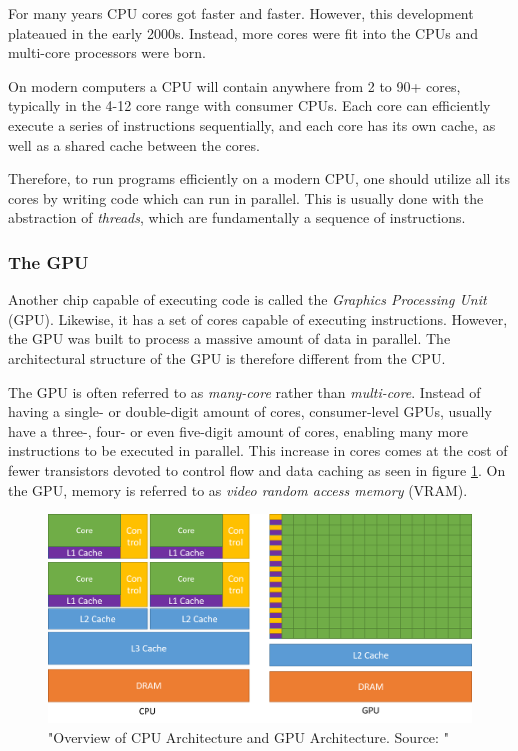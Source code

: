 \noindent For many years CPU cores got faster and faster. However, this development plateaued in the early 2000s. Instead, more cores were fit into the CPUs and multi-core processors were born.\cite{karlrupp:processor_trend_data}

On modern computers a CPU will contain anywhere from 2 to 90+ cores, typically in the 4-12 core range with consumer CPUs. Each core can efficiently execute a series of instructions sequentially, and each core has its own cache, as well as a shared cache between the cores.

Therefore, to run programs efficiently on a modern CPU, one should utilize all its cores by writing code which can run in parallel. This is usually done with the abstraction of \textit{threads}, which are fundamentally a sequence of instructions.\cite[p. 1022]{computersystems}\\

\subsubsection{The GPU} \label{background_gpu}

\noindent Another chip capable of executing code is called the \textit{Graphics Processing Unit} (GPU). Likewise, it has a set of cores capable of executing instructions. However, the GPU was built to process a massive amount of data in parallel. The architectural structure of the GPU is therefore different from the CPU.

The GPU is often referred to as \textit{many-core} rather than \textit{multi-core}. Instead of having a single- or double-digit amount of cores, consumer-level GPUs, usually have a three-, four- or even five-digit amount of cores, enabling many more instructions to be executed in parallel. This increase in cores comes at the cost of fewer transistors devoted to control flow and data caching as seen in figure \ref{fig:cpu_vs_gpu}.\cite[Sect. 1.1]{nvidia:cudadoc} On the GPU, memory is referred to as \textit{video random access memory} (VRAM).

\begin{figure}[ht]
\includegraphics[width=\textwidth]{Documents/Report/Figures/CPU vs GPU .png}
\caption{"Overview of CPU Architecture and GPU Architecture. Source: \cite[Figure 1]{nvidia:cudadoc}"}
\label{fig:cpu_vs_gpu}
\end{figure}

